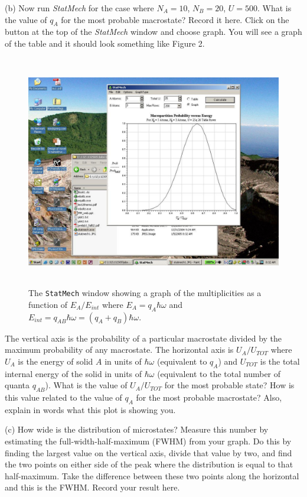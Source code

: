 (b) Now run {\it StatMech} for the case where $N_A = 10$, $N_B=20$, $U = 500$.
What is the value of $q_A$ for the most probable macrostate? 
Record it here.
Click on the button at the top of the {\it StatMech} window and choose graph.
You will see a graph of the table  and it should look something like
Figure 2.
\begin{figure}[!ht]
\begin{center}
\includegraphics[height=4.0in]{einstein_solid/statmech2.pdf}
\caption{The {\tt StatMech} window showing a graph of the multiplicities as a function
of $E_A/E_{int}$ where $E_A = q_A \hbar \omega$ and 
$E_{int} = q_{AB} \hbar \omega = (q_A+q_B)\hbar \omega$.}
\end{center}
\end{figure}
The vertical axis is the probability of a particular macrostate divided by the maximum
probability of any macrostate.
The horizontal axis is  $U_A/U_{TOT}$ where 
$U_A$ is the energy of solid $A$ in units of $\hbar\omega$ (equivalent to $q_A$) and $U_{TOT}$ is the total
internal energy of the solid in units of $\hbar\omega$ (equivalent 
to the total number of quanta $q_{AB}$).
What is the value of $U_A/U_{TOT}$ for the most probable state?
How is this value related to the value of $q_A$ for the most probable macrostate? 
Also, explain in words what this plot is showing you.
\vspace{25mm}

(c) How wide is the distribution of microstates?
Measure this number by estimating the full-width-half-maximum (FWHM) from your graph.
Do this by finding the largest value on the vertical axis, divide that value by two, and find
the two points on either side of the peak where the distribution is equal to that
half-maximum.
Take the difference between these two points along the horizontal and this is the FWHM.
Record your result here.
\answerspace{20mm}

